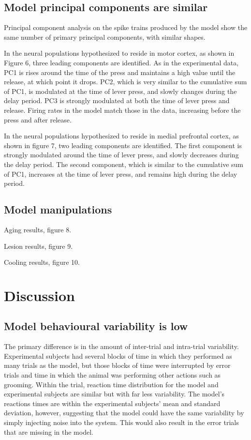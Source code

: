 \documentclass[12pt]{article}
\begin{document}
\subsection{Model principal components are similar}

Principal component analysis on the spike trains
produced by the model show the same number
of primary principal components, with similar shapes.

In the neural populations hypothesized
to reside in motor cortex, as shown in Figure 6,
three leading components are identified.
As in the experimental data,
PC1 is rises around the time of the press
and maintains a high value until the release,
at which point it drops.
PC2, which is very similar
to the cumulative sum of PC1,
is modulated at the time of lever press,
and slowly changes during the delay period.
PC3 is strongly modulated at both the
time of lever press and release.
Firing rates in the model match those in
the data, increasing before the press
and after release.

In the neural populations hypothesized
to reside in medial prefrontal cortex,
as shown in figure 7,
two leading components are identified.
The first component is strongly modulated
around the time of lever press,
and slowly decreases during the delay period.
The second component,
which is similar to the cumulative sum of
PC1, increases at the time of lever press,
and remains high during the delay period.

\subsection{Model manipulations}

Aging results, figure 8.

Lesion results, figure 9.

Cooling results, figure 10.

\section{Discussion}

\subsection{Model behavioural variability is low}

The primary difference is in the amount
of inter-trial and intra-trial variability.
Experimental subjects had several blocks of time
in which they performed as many trials as the model,
but those blocks of time were interrupted by
error trials and time in which the animal
was performing other actions such as grooming.
Within the trial, reaction time distribution
for the model and experimental subjects are
similar but with far less variability.
The model's reactions times
are within the experimental subjects'
mean and standard deviation, however,
suggesting that the model
could have the same variability
by simply injecting noise into the system.
This would also result in
the error trials that are missing in the model.
\end{document}
